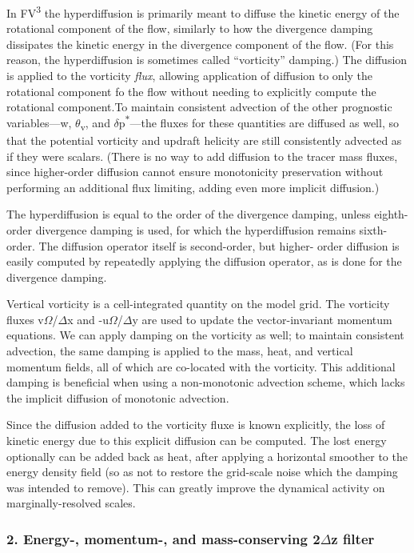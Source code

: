 In FV\textsuperscript{3} the hyperdiffusion is primarily meant to diffuse the kinetic energy of the rotational component of the flow, similarly to how the divergence damping dissipates the kinetic energy in the divergence component of the flow. (For this reason, the hyperdiffusion is sometimes called “vorticity” damping.) The diffusion is applied to the vorticity {\itshape flux}, allowing application of diffusion to only the rotational component fo the flow without needing to explicitly compute the rotational component.\+To maintain consistent advection of the other prognostic variables—w, {$\theta$}\textsubscript{v}, and {$\delta$}p\textsuperscript{$\ast$}—the fluxes for these quantities are diffused as well, so that the potential vorticity and updraft helicity are still consistently advected as if they were scalars. (There is no way to add diffusion to the tracer mass fluxes, since higher-\/order diffusion cannot ensure monotonicity preservation without performing an additional flux limiting, adding even more implicit diffusion.)

The hyperdiffusion is equal to the order of the divergence damping, unless eighth-\/order divergence damping is used, for which the hyperdiffusion remains sixth-\/order. The diffusion operator itself is second-\/order, but higher-\/ order diffusion is easily computed by repeatedly applying the diffusion operator, as is done for the divergence damping.

Vertical vorticity is a cell-\/integrated quantity on the model grid. The vorticity fluxes v{$\Omega$}/{$\Delta$}x and -\/u{$\Omega$}/{$\Delta$}y are used to update the vector-\/invariant momentum equations. We can apply damping on the vorticity as well; to maintain consistent advection, the same damping is applied to the mass, heat, and vertical momentum fields, all of which are co-\/located with the vorticity. This additional damping is beneficial when using a non-\/monotonic advection scheme, which lacks the implicit diffusion of monotonic advection.

Since the diffusion added to the vorticity fluxe is known explicitly, the loss of kinetic energy due to this explicit diffusion can be computed. The lost energy optionally can be added back as heat, after applying a horizontal smoother to the energy density field (so as not to restore the grid-\/scale noise which the damping was intended to remove). This can greatly improve the dynamical activity on marginally-\/resolved scales.

\subsubsection*{2. Energy-\/, momentum-\/, and mass-\/conserving 2{$\Delta$}z filter}

